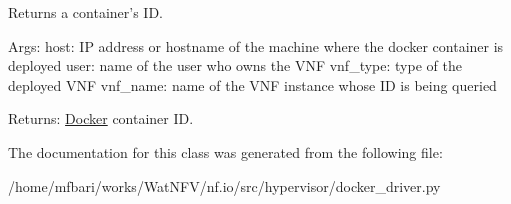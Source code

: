 Returns a container's I\-D. 

Args\-: host\-: I\-P address or hostname of the machine where the docker container is deployed user\-: name of the user who owns the V\-N\-F vnf\-\_\-type\-: type of the deployed V\-N\-F vnf\-\_\-name\-: name of the V\-N\-F instance whose I\-D is being queried

Returns\-: \hyperlink{classhypervisor_1_1docker__driver_1_1Docker}{Docker} container I\-D. 

The documentation for this class was generated from the following file\-:\begin{DoxyCompactItemize}
\item 
/home/mfbari/works/\-Wat\-N\-F\-V/nf.\-io/src/hypervisor/docker\-\_\-driver.\-py\end{DoxyCompactItemize}
